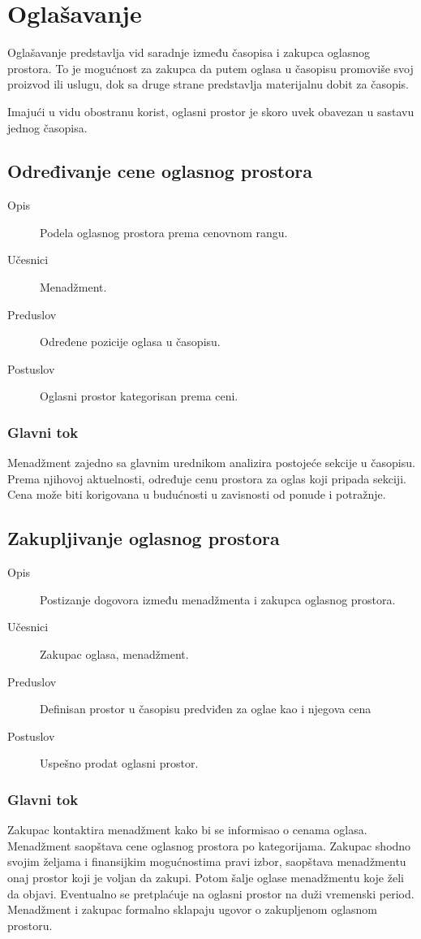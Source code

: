 \section{Oglašavanje}
Oglašavanje predstavlja vid saradnje između časopisa i zakupca oglasnog prostora. To je mogućnost za zakupca da putem oglasa u časopisu promoviše svoj proizvod ili uslugu, dok sa druge strane predstavlja materijalnu dobit za časopis.

Imajući u vidu obostranu korist, oglasni prostor je skoro uvek obavezan u sastavu jednog časopisa.

\subsection{Određivanje cene oglasnog prostora}
\begin{description}
\item [Opis] Podela oglasnog prostora prema cenovnom rangu.
\item [Učesnici] Menadžment.
\item [Preduslov] Određene pozicije oglasa u časopisu.
\item [Postuslov] Oglasni prostor kategorisan prema ceni.
\end{description}
\subsubsection{Glavni tok}
Menadžment zajedno sa glavnim urednikom analizira postojeće sekcije u časopisu. Prema njihovoj aktuelnosti, određuje cenu prostora za oglas koji pripada sekciji.
Cena može biti korigovana u budućnosti u zavisnosti od ponude i potražnje.

\subsection{Zakupljivanje oglasnog prostora}
\begin{description}
\item [Opis] Postizanje dogovora između menadžmenta i zakupca oglasnog prostora.
\item [Učesnici] Zakupac oglasa, menadžment.
\item [Preduslov] Definisan prostor u časopisu predviđen za oglae kao i njegova cena
\item [Postuslov] Uspešno prodat oglasni prostor.
\end{description}
\subsubsection{Glavni tok}
Zakupac kontaktira menadžment kako bi se informisao o cenama oglasa. Menadžment saopštava cene oglasnog prostora po kategorijama.
Zakupac shodno svojim željama i finansijkim mogućnostima pravi izbor, saopštava menadžmentu onaj prostor koji je voljan da zakupi. Potom šalje oglase menadžmentu koje želi da objavi. Eventualno se pretplaćuje na oglasni prostor na duži vremenski period.
Menadžment i zakupac formalno sklapaju ugovor o zakupljenom oglasnom prostoru.
